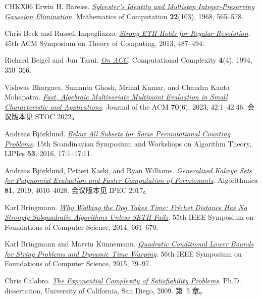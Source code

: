 \documentclass[11pt,reqno]{amsart}
\numberwithin{equation}{section}
\theoremstyle{definition}\newtheorem{definition}[theorem]{定义}
\theoremstyle{remark}\newtheorem{remark}[theorem]{注}
\begin{document}
\begin{thebibliography}{CHKX06}
Erwin H. Bareiss.
\href{https://doi.org/10.1090/S0025-5718-1968-0226829-0}
{\emph{Sylvester's Identity and Multistep Integer-Preserving Gaussian Elimination}}.
Mathematics of Computation \textbf{22}(103), 1968, 565--578.

Chris Beck and Russell Impagliazzo.
\href{https://doi.org/10.1145/2488608.2488669}
{\emph{Strong ETH Holds for Regular Resolution}}.
45th ACM Symposium on Theory of Computing, 2013, 487--494.

Richard Beigel and Jun Tarui.
\href{https://doi.org/10.1007/BF01263423}
{\emph{On ACC}}.
Computational Complexity \textbf{4}(4), 1994, 350--366.

Vishwas Bhargava, Sumanta Ghosh, Mrinal Kumar, and Chandra Kanta Mohapatra.
\href{https://doi.org/10.1145/3625226}
{\emph{Fast, Algebraic Multivariate Multipoint Evaluation in Small
Characteristic and Applications}}.
Journal of the ACM \textbf{70}(6), 2023, 42:1--42:46.
会议版本见 STOC 2022。

Andreas Bj\"orklund.
\href{https://doi.org/10.4230/LIPIcs.SWAT.2016.17}
{\emph{Below All Subsets for Some Permutational Counting Problems}}.
15th Scandinavian Symposium and Workshops on Algorithm Theory,
LIPIcs \textbf{53}, 2016, 17:1--17:11.

Andreas Bj\"orklund, Petteri Kaski, and Ryan Williams.
\href{https://doi.org/10.1007/s00453-018-0513-7}
{\emph{Generalized Kakeya Sets for Polynomial Evaluation and Faster
Computation of Fermionants}}.
Algorithmica \textbf{81}, 2019, 4010--4028.
会议版本见 IPEC 2017。

Karl Bringmann.
\href{https://doi.org/10.1109/FOCS.2014.76}
{\emph{Why Walking the Dog Takes Time: Fr\'echet Distance Has No Strongly
Subquadratic Algorithms Unless SETH Fails}}.
55th IEEE Symposium on Foundations of Computer Science, 2014, 661--670.

Karl Bringmann and Marvin K\"unnemann.
\href{https://doi.org/10.1109/FOCS.2015.15}
{\emph{Quadratic Conditional Lower Bounds for String Problems and
Dynamic Time Warping}}.
56th IEEE Symposium on Foundations of Computer Science, 2015, 79--97.

Chris Calabro.
\href{https://cseweb.ucsd.edu/~ccalabro/dissertation_single_spaced.pdf}
{\emph{The Exponential Complexity of Satisfiability Problems}}.
Ph.D. dissertation, University of California, San Diego, 2009.
第~5 章。


\end{thebibliography}
\end{document}
